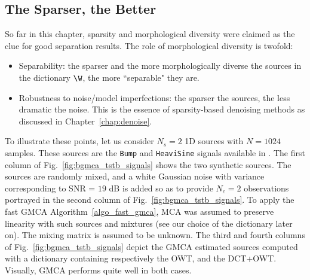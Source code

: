 \subsection{The Sparser, the Better}
\label{tstb}
So far in this chapter, sparsity and morphological diversity were claimed as the clue for good separation results. The role of morphological diversity is twofold:
\begin{itemize}
\item Separability:  the sparser and the more morphologically diverse the sources in the dictionary ${\W}$, the more ``separable" they are.  
\item Robustness to noise/model imperfections: the sparser the sources, the less dramatic the noise. This is the essence of sparsity-based denoising methods as discussed in Chapter~\ref{chap:denoise}.
\end{itemize}

To illustrate these points, let us consider $N_s = 2$ 1D sources with $N = 1024$ samples. These sources are the \texttt{Bump} and \texttt{HeaviSine} signals available in \citet{wave:wavelab}. The first column of Fig.\ \ref{fig:bgmca_tstb_signals}  shows the two synthetic sources. The sources are randomly mixed, and a white Gaussian noise with variance corresponding to SNR = $19$ dB is added so as to provide $N_c=2$ observations portrayed in the second column of Fig.\ \ref{fig:bgmca_tstb_signals}. To apply the fast GMCA Algorithm~\ref{algo_fast_gmca}, MCA was assumed to preserve linearity with such sources and mixtures (see our choice of the dictionary later on). The mixing matrix is assumed to be unknown. The third and fourth columns of Fig.\ \ref{fig:bgmca_tstb_signals} depict the GMCA estimated sources computed with a dictionary containing respectively the OWT, and the DCT+OWT. Visually, GMCA performs quite well in both cases.

